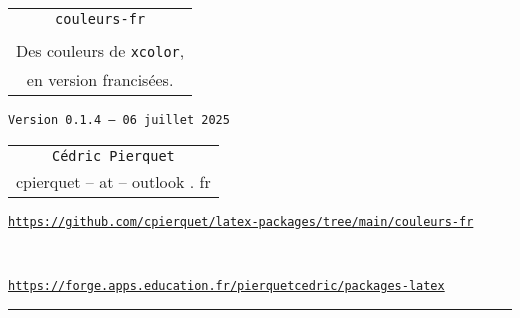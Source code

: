 \documentclass[french,11pt,a4paper]{article}
\def\TPversion{0.1.4}
\def\TPdate{06 juillet 2025}
\begin{document}
\pagestyle{fancy}

\thispagestyle{empty}

\begin{center}
	\begin{minipage}{0.75\linewidth}
	\begin{tcolorbox}[colframe=yellow,colback=yellow!15]
		\begin{center}
			\begin{tabular}{c}
				{\Huge \texttt{couleurs-fr}}\\
				\\
				{\LARGE Des couleurs de \texttt{xcolor},} \\
				{\LARGE en version francisées.} \\
			\end{tabular}
			
			\medskip
			
			{\small \texttt{Version \TPversion{} -- \TPdate}}
		\end{center}
	\end{tcolorbox}
\end{minipage}
\end{center}

\begin{center}
	\begin{tabular}{c}
	\texttt{Cédric Pierquet}\\
	{\ttfamily cpierquet -- at -- outlook . fr}
\end{tabular}
\end{center}

\begin{center}
\begin{minipage}{0.85\linewidth}
	\begin{tcolorbox}[colframe=teal,colback=teal!10,halign=center,fontupper=\footnotesize]
		\texttt{\url{https://github.com/cpierquet/latex-packages/tree/main/couleurs-fr}}
		
		~
		
		\texttt{\url{https://forge.apps.education.fr/pierquetcedric/packages-latex}}
	\end{tcolorbox}
\end{minipage}
\end{center}

\hrule


\hypertarget{matoc}{}

\tableofcontents

\vspace*{5mm}
\end{document}
